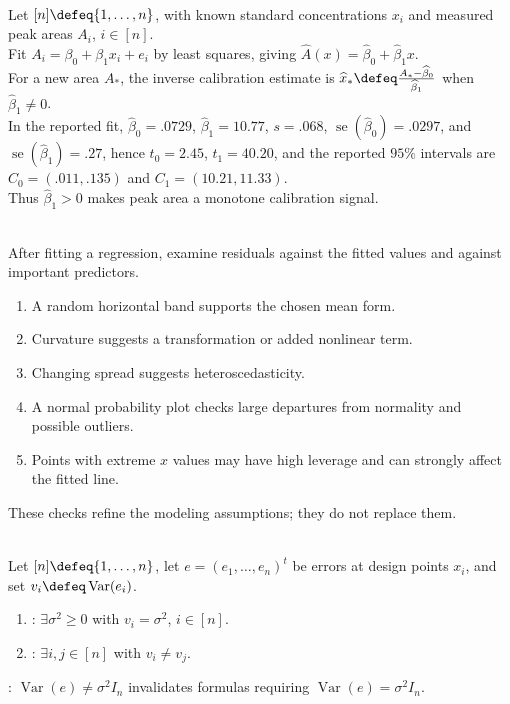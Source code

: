 \begin{example} \label{ex:peak-area-simple-regression-summary} \\
Let $[n]\defeq\{1,\ldots,n\}$, with known standard concentrations $x_i$ and measured peak areas $A_i$, $i\in[n]$.\\
Fit $A_i=\beta_0+\beta_1x_i+e_i$ by least squares, giving $\widehat{A}(x)=\widehat{\beta}_0+\widehat{\beta}_1x$.\\
For a new area $A_\ast$, the inverse calibration estimate is $\widehat{x}_\ast\defeq\frac{A_\ast-\widehat{\beta}_0}{\widehat{\beta}_1}$ when $\widehat{\beta}_1\neq0$.\\
In the reported fit, $\widehat{\beta}_0=.0729$, $\widehat{\beta}_1=10.77$, $s=.068$, $\operatorname{se}(\widehat{\beta}_0)=.0297$, and $\operatorname{se}(\widehat{\beta}_1)=.27$, hence $t_0=2.45$, $t_1=40.20$, and the reported $95\%$ intervals are $C_0=(.011,.135)$ and $C_1=(10.21,11.33)$.\\
Thus $\widehat{\beta}_1>0$ makes peak area a monotone calibration signal.
\end{example}

\begin{method} \label{meth:regression-residual-diagnostics} \\
After fitting a regression, examine residuals against the fitted values and against important predictors.
\begin{enumerate}[label=(\roman*)]
\setlength{\itemsep}{0pt}
\item A random horizontal band supports the chosen mean form.
\item Curvature suggests a transformation or added nonlinear term.
\item Changing spread suggests heteroscedasticity.
\item A normal probability plot checks large departures from normality and possible outliers.
\item Points with extreme $x$ values may have high leverage and can strongly affect the fitted line.
\end{enumerate}
These checks refine the modeling assumptions; they do not replace them.
\end{method}

\begin{definition} \label{def:homoscedastic-and-heteroscedastic-errors} \\
Let $[n]\defeq\{1,\ldots,n\}$, let $e=(e_1,\ldots,e_n)^t$ be errors at design points $x_i$, and set $v_i\defeq\operatorname{Var}(e_i)$.
\begin{enumerate}[label=(\roman*)]
\setlength{\itemsep}{0pt}
\item {}: $\exists\sigma^2\geq0$ with $v_i=\sigma^2$, $i\in[n]$.
\item {}: $\exists i,j\in[n]$ with $v_i\neq v_j$.
\end{enumerate}
: $\operatorname{Var}(e)\neq\sigma^2I_n$ invalidates formulas requiring $\operatorname{Var}(e)=\sigma^2I_n$.
\end{definition}

